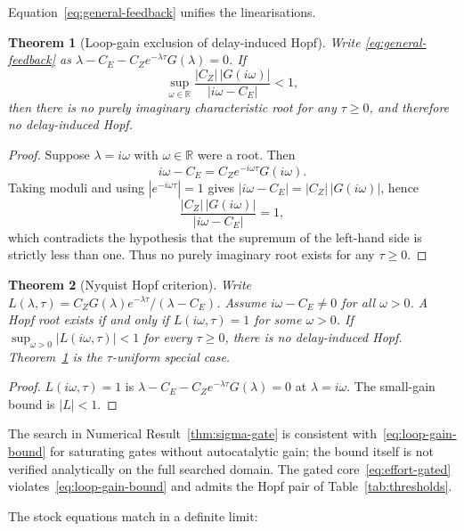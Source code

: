 \documentclass[11pt]{article}
\newtheorem{theorem}{Theorem}
\theoremstyle{definition}
\begin{document}
Equation~\eqref{eq:general-feedback} unifies the linearisations.

\begin{theorem}[Loop-gain exclusion of delay-induced Hopf]
\label{thm:loop-gain}
Write \eqref{eq:general-feedback} as $\lambda-C_E-C_Z e^{-\lambda\tau}G(\lambda)=0$. If
\begin{equation}
\sup_{\omega\in\mathbb R}\frac{|C_Z|\,|G(i\omega)|}{|i\omega-C_E|}<1,
\label{eq:loop-gain-bound}
\end{equation}
then there is no purely imaginary characteristic root for any $\tau\ge 0$, and therefore no delay-induced Hopf.
\end{theorem}

\begin{proof}
Suppose $\lambda=i\omega$ with $\omega\in\mathbb R$ were a root. Then
\[
i\omega-C_E=C_Z e^{-i\omega\tau}G(i\omega).
\]
Taking moduli and using $|e^{-i\omega\tau}|=1$ gives $|i\omega-C_E|=|C_Z|\,|G(i\omega)|$, hence
\[
\frac{|C_Z|\,|G(i\omega)|}{|i\omega-C_E|}=1,
\]
which contradicts the hypothesis that the supremum of the left-hand side is strictly less than one. Thus no purely imaginary root exists for any $\tau\ge 0$.
\end{proof}

\begin{theorem}[Nyquist Hopf criterion]
\label{thm:nyquist}
Write $L(\lambda,\tau)=C_Z G(\lambda)e^{-\lambda\tau}/(\lambda-C_E)$. Assume $i\omega-C_E\neq 0$ for all $\omega>0$. A Hopf root exists if and only if $L(i\omega,\tau)=1$ for some $\omega>0$. If $\sup_{\omega>0}|L(i\omega,\tau)|<1$ for every $\tau\ge 0$, there is no delay-induced Hopf. Theorem~\ref{thm:loop-gain} is the $\tau$-uniform special case.
\end{theorem}

\begin{proof}
$L(i\omega,\tau)=1$ is $\lambda-C_E-C_Z e^{-\lambda\tau}G(\lambda)=0$ at $\lambda=i\omega$. The small-gain bound is $|L|<1$.
\end{proof}

The search in Numerical Result~\ref{thm:sigma-gate} is consistent with~\eqref{eq:loop-gain-bound} for saturating gates without autocatalytic gain; the bound itself is not verified analytically on the full searched domain. The gated core~\eqref{eq:effort-gated} violates~\eqref{eq:loop-gain-bound} and admits the Hopf pair of Table~\ref{tab:thresholds}.

The stock equations match in a definite limit:
\end{document}

